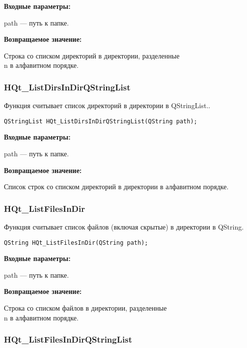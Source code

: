 \documentclass[a4paper,12pt]{article}
\begin{document}
\textbf{Входные параметры:}

path --- путь к папке.

\textbf{Возвращаемое значение:}

 Строка со списком директорий в директории, разделенные \\n в алфавитном порядке.


\subsubsection{HQt\_ListDirsInDirQStringList}\label{HQt_ListDirsInDirQStringList}

Функция считывает список директорий в директории в QStringList..


\begin{lstlisting}[label=code_syntax_HQt_ListDirsInDirQStringList,caption=Синтаксис]
QStringList HQt_ListDirsInDirQStringList(QString path);
\end{lstlisting}

\textbf{Входные параметры:}

path --- путь к папке.

\textbf{Возвращаемое значение:}

Список строк со списком директорий в директории в алфавитном порядке.


\subsubsection{HQt\_ListFilesInDir}\label{HQt_ListFilesInDir}

Функция считывает список файлов (включая скрытые) в директории в QString.


\begin{lstlisting}[label=code_syntax_HQt_ListFilesInDir,caption=Синтаксис]
QString HQt_ListFilesInDir(QString path);
\end{lstlisting}

\textbf{Входные параметры:}

path --- путь к папке.

\textbf{Возвращаемое значение:}

Строка со списком файлов в директории, разделенные \\n в алфавитном порядке.


\subsubsection{HQt\_ListFilesInDirQStringList}\label{HQt_ListFilesInDirQStringList}
\end{document}
